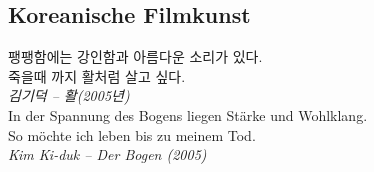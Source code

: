 \documentclass{book}		%
\begin{document}
\begin{CJK}{UTF8}{mj}
\setcounter{chapter}{2}
\chapter{Koreanische Filmkunst}

\vspace{2cm}
\centering
팽팽함에는 강인함과 아름다운 소리가 있다.\\
죽을때 까지 활처럼 살고 싶다.\\
\emph{김기덕 -- 활(2005년)}\\[1cm]
In der Spannung des Bogens liegen Stärke und Wohlklang.\\
So möchte ich leben bis zu meinem Tod.\\
\emph{Kim Ki-duk -- Der Bogen (2005)}

\end{CJK}
\end{document}

